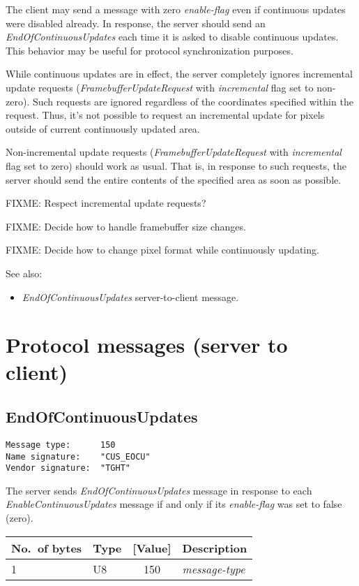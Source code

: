 \documentclass[a4paper]{article}
\newcommand{\typestr}[1]{\textit{#1}}
\begin{document}
The client may send a message with zero \typestr{enable-flag} even if
continuous updates were disabled already. In response, the server
should send an \typestr{EndOfContinuousUpdates} each time it is asked
to disable continuous updates. This behavior may be useful for
protocol synchronization purposes.

While continuous updates are in effect, the server completely ignores
incremental update requests (\typestr{FramebufferUpdateRequest} with
\typestr{incremental} flag set to non-zero). Such requests are ignored
regardless of the coordinates specified within the request. Thus, it's
not possible to request an incremental update for pixels outside of
current continuously updated area.

Non-incremental update requests (\typestr{FramebufferUpdateRequest}
with \typestr{incremental} flag set to zero) should work as usual.
That is, in response to such requests, the server should send the
entire contents of the specified area as soon as possible.

FIXME: Respect incremental update requests?

FIXME: Decide how to handle framebuffer size changes.

FIXME: Decide how to change pixel format while continuously updating.

See also:
\begin{itemize}
\item \typestr{EndOfContinuousUpdates} server-to-client message.
\end{itemize}

\newpage
\section{Protocol messages (server to client)}

\subsection{EndOfContinuousUpdates}
\begin{verbatim}
Message type:      150
Name signature:    "CUS_EOCU"
Vendor signature:  "TGHT"
\end{verbatim}

The server sends \typestr{EndOfContinuousUpdates} message in response
to each \typestr{EnableContinuousUpdates} message if and only if its
\typestr{enable-flag} was set to false (zero).

\begin{tabular}{l|lc|l} \hline
No.\ of bytes & Type & [Value] & Description \\ \hline
1 & U8  & 150 & \typestr{message-type} \\
\hline\end{tabular}
\end{document}
